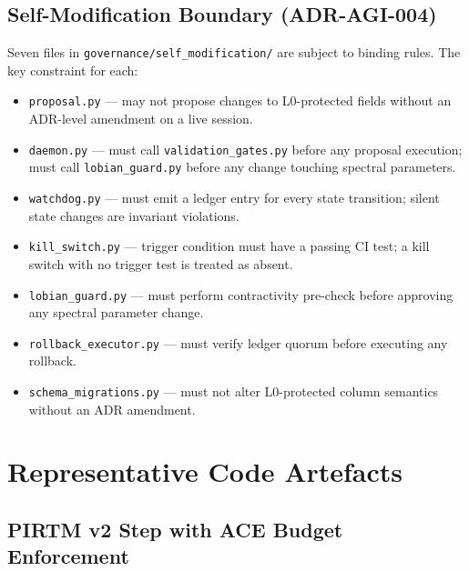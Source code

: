 \documentclass[12pt,a4paper]{article}
\theoremstyle{definition}
\theoremstyle{plain}
\theoremstyle{remark}
\begin{document}
\subsection{Self-Modification Boundary (ADR-AGI-004)}

Seven files in \texttt{governance/self\_modification/} are subject to binding
rules. The key constraint for each:

\begin{itemize}
  \item \texttt{proposal.py} --- may not propose changes to L0-protected fields
    without an ADR-level amendment on a live session.
  \item \texttt{daemon.py} --- must call \texttt{validation\_gates.py} before
    any proposal execution; must call \texttt{lobian\_guard.py} before any
    change touching spectral parameters.
  \item \texttt{watchdog.py} --- must emit a ledger entry for every state
    transition; silent state changes are invariant violations.
  \item \texttt{kill\_switch.py} --- trigger condition must have a passing CI
    test; a kill switch with no trigger test is treated as absent.
  \item \texttt{lobian\_guard.py} --- must perform contractivity pre-check
    before approving any spectral parameter change.
  \item \texttt{rollback\_executor.py} --- must verify ledger quorum before
    executing any rollback.
  \item \texttt{schema\_migrations.py} --- must not alter L0-protected column
    semantics without an ADR amendment.
\end{itemize}

\newpage

\section{Representative Code Artefacts}
\label{sec:code}

\subsection{PIRTM v2 Step with ACE Budget Enforcement}
\end{document}
